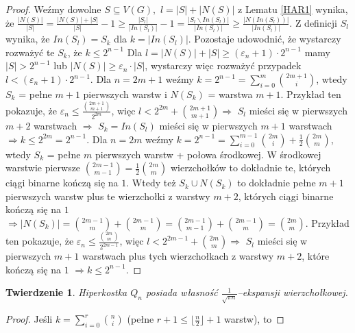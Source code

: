 \documentclass{pracamgr}
\newtheorem{theorem}{Twierdzenie}[chapter]
\begin{document}
   \begin{spacing}{1.7}
    \begin{proof}
     Weźmy dowolne $S\subseteq V(G),$ $l=|S|+|N(S)|$ z Lematu \ref{HAR1} wynika, że
     $\frac{|N(S)|}{|S|}=\frac{|N(S)|+|S|}{|S|}-1\ge\frac{|S_l|}{|In(S_l)|}-1=\frac{|S_l\backslash In(S_l)|}{|In(S_l)|}\ge\frac{|N(In(S_l))|}{|In(S_l)|}$.
     Z definicji $S_l$ wynika, że $In(S_l)=S_k$ dla $k=|In(S_l)|$.\newline
     Pozostaje udowodnić, że wystarczy rozważyć te $S_k$, że $k\le2^{n-1}$\newline
     Dla $l=|N(S)|+|S|\ge(\varepsilon_n+1)\cdot 2^{n-1}$ mamy $|S|>2^{n-1}$ lub $|N(S)|\ge\varepsilon_n\cdot|S|$, wystarczy więc rozważyć przypadek
     $l<(\varepsilon_n+1)\cdot 2^{n-1}$.\newline
     Dla $n=2m+1$ weźmy $k=2^{n-1}=\sum_{i=0}^{m}{2m+1 \choose i}$, wtedy $S_k$ = pełne $m+1$ pierwszych warstw i $N(S_k)$ = warstwa $m+1$.
     Przykład ten pokazuje, że $\varepsilon_n\le\frac{{2m+1 \choose m+1}}{2^{2m}}$,
     więc $l<2^{2m}+{2m+1 \choose m+1}\Rightarrow$ $S_l$ mieści się w pierwszych $m+2$ warstwach
     $\Rightarrow$ $S_k=In(S_l)$ mieści się w pierwszych $m+1$ warstwach $\Rightarrow k\le 2^{2m}=2^{n-1}$.\newline
     Dla $n=2m$ weźmy $k=2^{n-1}=\sum_{i=0}^{m-1}{2m \choose i}+\frac{1}{2}{2m\choose m}$, wtedy $S_k$ = pełne $m$ pierwszych warstw + połowa środkowej.
     W środkowej warstwie pierwsze ${2m-1\choose m-1}=\frac{1}{2}{2m \choose m}$ wierzchołków to dokładnie te, których ciągi binarne kończą się na $1$.
     Wtedy też $S_k\cup N(S_k)$ to dokładnie pełne $m+1$ pierwszych warstw plus te wierzchołki z warstwy $m+2$, których ciągi binarne kończą się na $1$
     $\Rightarrow |N(S_k)|={2m-1\choose m}+{2m-1\choose m}={2m-1\choose m-1}+{2m-1 \choose m}={2m\choose m}$.
     Przykład ten pokazuje, że $\varepsilon_n\le\frac{{2m \choose m}}{2^{2m-1}}$,
     więc $l<2^{2m-1}+{2m \choose m}\Rightarrow$ $S_l$ mieści się w pierwszych $m+1$ warstwach plus tych wierzchołkach z warstwy $m+2$, które kończą się na $1$
     $\Rightarrow k\le2^{n-1}$.
    \end{proof}
    \begin{theorem}\label{ekspansja kostki}
     Hiperkostka $Q_n$ posiada własność $\frac{1}{\sqrt{\pi n}}$--ekspansji wierzchołkowej.
    \end{theorem}
    \vspace*{-15pt}
    \begin{proof}
     Jeśli $k=\sum_{i=0}^{r}{n\choose i}$ (pełne $r+1\le\lfloor\frac{n}{2}\rfloor+1$ warstw), to

\end{proof}
\end{spacing}
\end{document}
